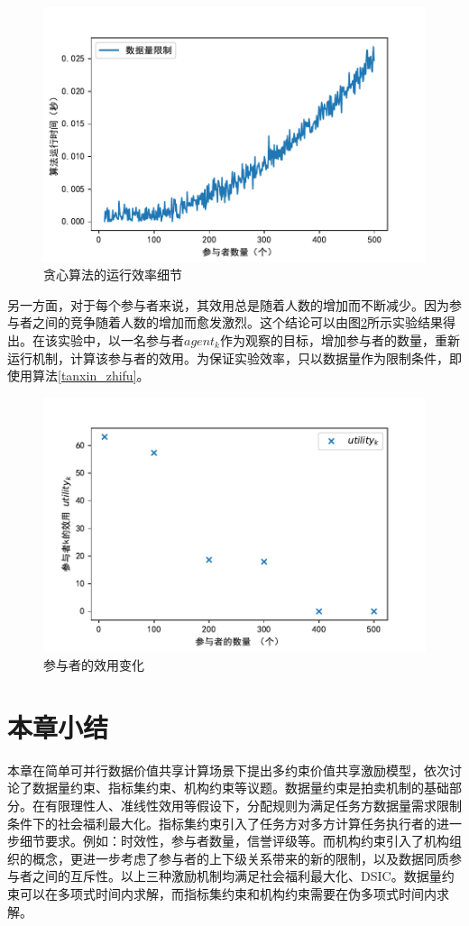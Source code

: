\documentclass[promaster]{thesis-uestc}
\begin{document}
\begin{figure}[H]
    \includegraphics[width=350pt]{exp/greedytimes.pdf}
    \caption{贪心算法的运行效率细节}
    \label{greedytimes}
\end{figure}

另一方面，对于每个参与者来说，其效用总是随着人数的增加而不断减少。因为参与者之间的竞争随着人数的增加而愈发激烈。这个结论可以由图\ref{utility}所示实验结果得出。在该实验中，以一名参与者$agent_k$作为观察的目标，增加参与者的数量，重新运行机制，计算该参与者的效用。为保证实验效率，只以数据量作为限制条件，即使用算法\ref{tanxin_zhifu}。

\begin{figure}[H]
\includegraphics[width=350pt]{exp/utility.pdf}
\caption{参与者的效用变化}
\label{utility}
\end{figure}

\FloatBarrier

\section{本章小结}
本章在简单可并行数据价值共享计算场景下提出多约束价值共享激励模型，依次讨论了数据量约束、指标集约束、机构约束等议题。数据量约束是拍卖机制的基础部分。在有限理性人、准线性效用等假设下，分配规则为满足任务方数据量需求限制条件下的社会福利最大化。指标集约束引入了任务方对多方计算任务执行者的进一步细节要求。例如：时效性，参与者数量，信誉评级等。而机构约束引入了机构组织的概念，更进一步考虑了参与者的上下级关系带来的新的限制，以及数据同质参与者之间的互斥性。以上三种激励机制均满足社会福利最大化、DSIC。数据量约束可以在多项式时间内求解，而指标集约束和机构约束需要在伪多项式时间内求解。
\end{document}

